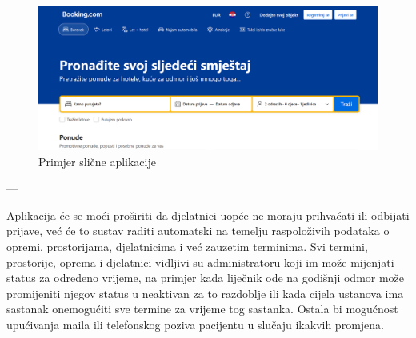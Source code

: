 		\begin{figure}[H]
			\includegraphics[scale=0.4]{slike/slicna_aplikacija.PNG} %
			\centering
			\caption{Primjer slične aplikacije}
			\label{fig:booking}
		\end{figure}
		
		---
		
		Aplikacija će se moći proširiti da djelatnici uopće ne moraju prihvaćati ili odbijati prijave, već će to sustav raditi automatski na temelju raspoloživih podataka o opremi, prostorijama, djelatnicima i već zauzetim terminima. Svi termini, prostorije, oprema i djelatnici vidljivi su administratoru koji im može mijenjati status za određeno vrijeme, na primjer kada liječnik ode na godišnji odmor može promijeniti njegov status u neaktivan za to razdoblje ili kada cijela ustanova ima sastanak onemogućiti sve termine za vrijeme tog sastanka. Ostala bi mogućnost upućivanja maila ili telefonskog poziva pacijentu u slučaju ikakvih promjena.
		
	
		\eject
		
				
	